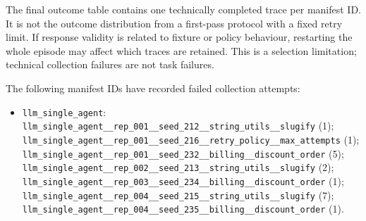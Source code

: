 \documentclass[12pt,a4paper,oneside]{report}
\begin{document}
The final outcome table contains one technically completed trace per manifest ID. It is not the outcome distribution from a first-pass protocol with a fixed retry limit. If response validity is related to fixture or policy behaviour, restarting the whole episode may affect which traces are retained. This is a selection limitation; technical collection failures are not task failures.

The following manifest IDs have recorded failed collection attempts:

\begin{itemize}
\item \texttt{llm\allowbreak\_single\allowbreak\_agent}: \texttt{llm\allowbreak\_single\allowbreak\_agent\allowbreak\_\allowbreak\_rep\allowbreak\_001\allowbreak\_\allowbreak\_seed\allowbreak\_212\allowbreak\_\allowbreak\_string\allowbreak\_utils\allowbreak\_\allowbreak\_slugify} (1); \texttt{llm\allowbreak\_single\allowbreak\_agent\allowbreak\_\allowbreak\_rep\allowbreak\_001\allowbreak\_\allowbreak\_seed\allowbreak\_216\allowbreak\_\allowbreak\_retry\allowbreak\_policy\allowbreak\_\allowbreak\_max\allowbreak\_attempts} (1); \texttt{llm\allowbreak\_single\allowbreak\_agent\allowbreak\_\allowbreak\_rep\allowbreak\_001\allowbreak\_\allowbreak\_seed\allowbreak\_232\allowbreak\_\allowbreak\_billing\allowbreak\_\allowbreak\_discount\allowbreak\_order} (5); \texttt{llm\allowbreak\_single\allowbreak\_agent\allowbreak\_\allowbreak\_rep\allowbreak\_002\allowbreak\_\allowbreak\_seed\allowbreak\_213\allowbreak\_\allowbreak\_string\allowbreak\_utils\allowbreak\_\allowbreak\_slugify} (2); \texttt{llm\allowbreak\_single\allowbreak\_agent\allowbreak\_\allowbreak\_rep\allowbreak\_003\allowbreak\_\allowbreak\_seed\allowbreak\_234\allowbreak\_\allowbreak\_billing\allowbreak\_\allowbreak\_discount\allowbreak\_order} (1); \texttt{llm\allowbreak\_single\allowbreak\_agent\allowbreak\_\allowbreak\_rep\allowbreak\_004\allowbreak\_\allowbreak\_seed\allowbreak\_215\allowbreak\_\allowbreak\_string\allowbreak\_utils\allowbreak\_\allowbreak\_slugify} (7); \texttt{llm\allowbreak\_single\allowbreak\_agent\allowbreak\_\allowbreak\_rep\allowbreak\_004\allowbreak\_\allowbreak\_seed\allowbreak\_235\allowbreak\_\allowbreak\_billing\allowbreak\_\allowbreak\_discount\allowbreak\_order} (1).

\end{itemize}
\end{document}
